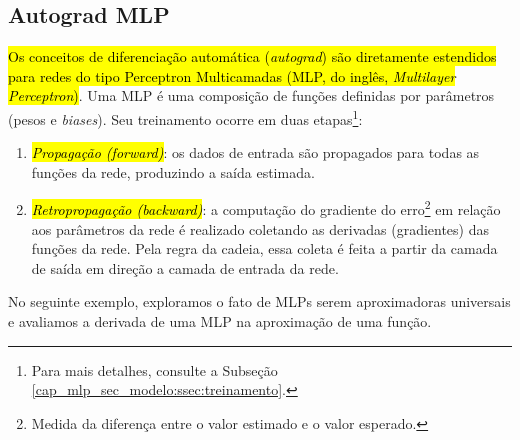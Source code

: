 \subsection{Autograd MLP}

\hl{Os conceitos de diferenciação automática (\emph{autograd}) são diretamente estendidos para redes do tipo Perceptron Multicamadas (MLP, do inglês, \textit{Multilayer Perceptron})}. Uma MLP é uma composição de funções definidas por parâmetros (pesos e \textit{biases}). Seu treinamento ocorre em duas etapas\footnote{Para mais detalhes, consulte a Subseção \ref{cap_mlp_sec_modelo:ssec:treinamento}.}:
\begin{enumerate}[1.]
\item \hl{\emph{Propagação (\textit{forward})}}: os dados de entrada são propagados para todas as funções da rede, produzindo a saída estimada.
\item \hl{\emph{Retropropagação (\textit{backward})}}: a computação do gradiente do erro\footnote{Medida da diferença entre o valor estimado e o valor esperado.} em relação aos parâmetros da rede é realizado coletando as derivadas (gradientes) das funções da rede. Pela regra da cadeia, essa coleta é feita a partir da camada de saída em direção a camada de entrada da rede.
\end{enumerate}

No seguinte exemplo, exploramos o fato de MLPs serem aproximadoras universais e avaliamos a derivada de uma MLP na aproximação de uma função.

